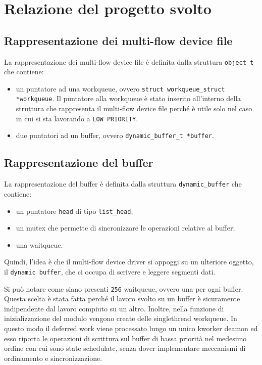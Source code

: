 \documentclass[oneside]{article}
\begin{document}
\section{Relazione del progetto svolto}
\subsection{Rappresentazione dei multi-flow device file}
La rappresentazione dei multi-flow device file è definita dalla struttura \texttt{object\_t} che contiene:
\begin{itemize}
\item un puntatore ad una workqueue, ovvero \texttt{struct workqueue\_struct *workqueue}. Il puntatore alla workqueue è stato inserito all'interno della struttura che rappresenta il multi-flow device file perché è utile solo nel caso in cui si sta lavorando a \texttt{LOW PRIORITY}.
\item due puntatori ad un buffer, ovvero \texttt{dynamic\_buffer\_t *buffer}.
\end{itemize}

\subsection{Rappresentazione del buffer}
La rappresentazione del buffer è definita dalla struttura \texttt{dynamic\_buffer} che contiene:
\begin{itemize}
\item un puntatore \texttt{head} di tipo \texttt{list\_head};
\item un mutex che permette di sincronizzare le operazioni relative al buffer;
\item una waitqueue.
\end{itemize}
Quindi, l'idea è che il multi-flow device driver si appoggi su un ulteriore oggetto, il \texttt{dynamic buffer}, che ci occupa di scrivere e leggere segmenti dati.


Si può notare come siano presenti \texttt{256} waitqueue, ovvero una per ogni buffer. Questa scelta è stata fatta perché il lavoro svolto su un buffer è sicuramente indipendente dal lavoro compiuto su un altro. Inoltre, nella funzione di inizializzazione del modulo vengono create delle singlethread workqueue. In questo modo il deferred work viene processato lungo un unico kworker deamon ed esso riporta le operazioni di scrittura sul buffer di bassa priorità nel medesimo ordine con cui sono state schedulate, senza dover implementare meccanismi di ordinamento e sincronizzazione.
\end{document}

